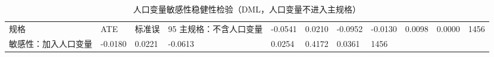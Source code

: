 \begin{table}
\caption{人口变量敏感性稳健性检验（DML，人口变量不进入主规格）}
\label{tab:population_sensitivity_robustness}
\begin{tabular}{llllllll}
\toprule
规格 & ATE & 标准误 & 95%
\midrule
主规格：不含人口变量 & -0.0541 & 0.0210 & -0.0952 & -0.0130 & 0.0098 & 0.0000 & 1456 \\
敏感性：加入人口变量 & -0.0180 & 0.0221 & -0.0613 & 0.0254 & 0.4172 & 0.0361 & 1456 \\
\bottomrule
\end{tabular}
\end{table}
